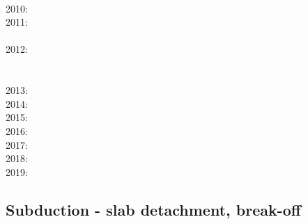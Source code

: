       \cite{huby09}\\
2010: \cite{hagr10}\cite{lobh10}\cite{mamb10}\cite{camg10}\cite{casm10}\cite{ligb10}\cite{stfc10}
      \cite{moyb10}\cite{zhst10}\cite{qusp10}\cite{moht10}\cite{leki10}\\
2011: \cite{lixg11}\cite{list11}\cite{bubj11}\cite{bagw11b}\cite{cafz11}\cite{geme11}\cite{qube11}\\
      \cite{blgg11}\cite{gery11b}\cite{leki11}\\
2012: \cite{anwb12}\cite{jahu12}\cite{jabi12}\cite{jabk12}\cite{lixg12}\cite{grpy12}\cite{grpy12b}\\
      \cite{ronb12}\cite{tebu12}\cite{thka12}\cite{bova12}\cite{civs12}\cite{camo12}\cite{cafa12} \\
      \cite{gebk12}\cite{liri12}\cite{beva12}\cite{uegb12}\cite{bija12}\\
2013: \cite{nabg13}\cite{hage13}\cite{ancv13}\cite{namu13}\cite{yosh13}\cite{zhgt13}\cite{lixg13} 
      \cite{jabr13}\cite{izht13}\cite{luws13}\cite{dusc13}\cite{tibb13}\cite{bubj13}\cite{scmo13} 
      \cite{fuob13}\cite{magc13}\cite{musi13}\cite{mibg13}\cite{grpy13}\cite{vagd13a}\cite{vagd13b}
      \cite{cavg13}\cite{vocg13}\cite{qula13}\cite{bugu13}\\
2014: \cite{robn14}\cite{hond14}\cite{ronc14}\cite{mobm14}\cite{famc14}\cite{fogm14}\cite{frba14} 
      \cite{gagd14}\cite{voge14}\cite{voge14b}\cite{lidr14}\cite{bocj04}\cite{bagb14}\cite{stjm14}
      \cite{basc14}\cite{vamd14}\cite{kile14}\cite{jahm14}\cite{bufa14}\cite{bufy14b}\cite{chsv14}
      \cite{chsg14}\\
2015: \cite{bemm15}\cite{bomv15}\cite{bogf15}\cite{ceag15}\cite{kifr15}\cite{vami15}\cite{dali15}\\
2016: \cite{tomy16}\cite{gukt16}\cite{robn16}\cite{mavm16}\\
2017: \cite{kicf17}\cite{sche17}\cite{pest17}\cite{vomc17}\cite{majf17}\cite{yabr17}\\
2018: \cite{yamz18}\cite{crli18}\cite{spcv18}\\
2019: \cite{magn19}\cite{mavb19}\cite{scvm19}\cite{cakc19}\cite{samo19}

\subsection*{Subduction - slab detachment, break-off}
 

